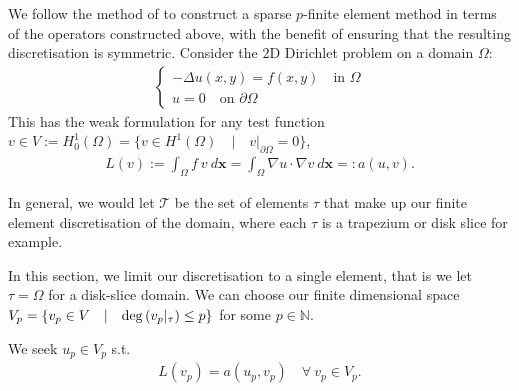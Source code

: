 \documentclass[11pt, oneside]{article}   	%
\newcommand{\N}{\mathbb{N}}
\newcommand{\element}{\tau}
\newcommand{\FEset}{\mathcal{T}}
\begin{document}
We follow the method of \cite{beuchler2006new} to construct a sparse $p$-finite element method in terms of the operators constructed above, with the benefit of ensuring that the resulting discretisation is symmetric. Consider the 2D Dirichlet problem on a domain $\Omega$:
\begin{align*}
	\begin{cases}
         - \Delta u(x,y) = f(x,y) \quad \text{in } \Omega \\
         u = 0 \quad \text{on } \partial \Omega
         \end{cases}
\end{align*}
This has the weak formulation for any test function $v \in V := H_0^1(\Omega) = \{v \in H^1(\Omega) \quad | \quad v|_{\partial \Omega} = 0 \}$,
\begin{align*}
	L(v) := \int_\Omega f \: v \: d\mathbf{x} = \int_\Omega \nabla u \cdot \nabla v \: d\mathbf{x} =: a(u,v).
\end{align*}

In general, we would let $\FEset$ be the set of elements $\element$ that make up our finite element discretisation of the domain, where each $\element$ is a trapezium or disk slice for example. 

In this section, we limit our discretisation to a single element, that is we let $\element = \Omega$ for a disk-slice domain. We can choose our finite dimensional space $V_p = \{v_p \in V \quad | \quad {\rm deg}\,(v_p|_\element) \le p\}$ for some $p \in \N$.

We seek $u_p \in V_p$ s.t.
\begin{align}
	L(v_p) = a(u_p,v_p) \quad \forall \: v_p \in V_p.
	\label{eqn:FEMweakform}
\end{align}
\end{document}
